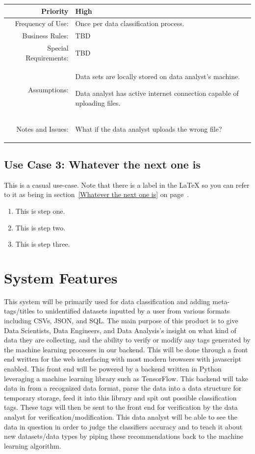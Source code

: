 \documentclass[12pt,oneside,letterpaper]{article}
\newenvironment{packed_enumerate}{ %
\vspace{-7mm}
\begin{enumerate}
  \setlength{\itemsep}{0pt}
  \setlength{\parskip}{0pt}
  \setlength{\parsep}{0pt}
}{\end{enumerate}
\vspace{-8mm}}
\begin{document}
\begin{longtable}{|r|p{3.8in}|}
\hline
Priority&High\\
\hline
Frequency of Use:&Once per data classification process.\\
\hline
Business Rules:&TBD\\
\hline
Special Requirements:&TBD\\
\hline
Assumptions:&\begin{packed_enumerate}
\item Data sets are locally stored on data analyst's machine.
\item Data analyst has active internet connection capable of uploading files.
\end{packed_enumerate}\\
\hline
Notes and Issues:&\begin{packed_enumerate}
\item What if the data analyst uploads the wrong file?
\end{packed_enumerate}\\
\hline
\end{longtable}



\subsection{\label{Whatever the next one is}Use Case 3: Whatever the next one is}
This is a casual use-case.  Note that there is a label in the LaTeX so you can refer
to it as being in section~\ref{Whatever the next one is} on page~\pageref{Whatever the next one is}.
\begin{enumerate}
\item This is step one.
\item This is step two.
\item This is step three.
\end{enumerate}

\section{System Features}
This system will be primarily used for data classification and adding meta-tags/titles to unidentified datasets inputted by a user from various formats including CSVs, JSON, and SQL. The main purpose of this product is to give Data Scientists, Data Engineers, and Data Analysis's insight on what kind of data they are collecting, and the ability to verify or modify any tags generated by the machine learning processes in our backend. This will be done through a front end written for the web interfacing with most modern browsers with javascript enabled. This front end will be powered by a backend written in Python leveraging a machine learning library such as TensorFlow. This backend will take data in from a recognized data format, parse the data into a data structure for temporary storage, feed it into this library and spit out possible classification tags. These tags will then be sent to the front end for verification by the data analyst for verification/modification. This data analyst will be able to see the data in question in order to judge the classifiers accuracy and to teach it about new datasets/data types by piping these recommendations back to the machine learning algorithm.
\end{document}
